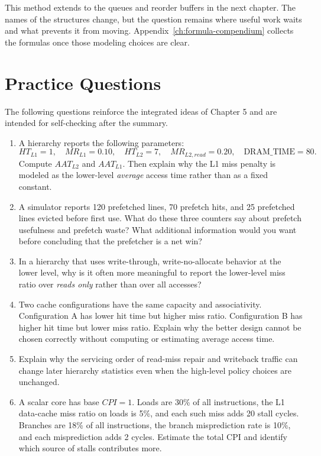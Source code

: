 This method extends to the queues and reorder buffers in the next chapter.
The names of the structures change, but the question remains where useful work waits and what prevents it from moving.
Appendix~\ref{ch:formula-compendium} collects the formulas once those modeling choices are clear.


\section{Practice Questions}\label{sec:ch5-practice}
The following questions reinforce the integrated ideas of Chapter 5 and are intended for self-checking after the summary.
\begin{enumerate}[beginpenalty=10000]
    \item A hierarchy reports the following parameters:
    \[
        HT_{L1}=1,\quad MR_{L1}=0.10,\quad HT_{L2}=7,\quad MR_{L2,read}=0.20,\quad \text{DRAM\_TIME}=80.
    \]
    Compute $AAT_{L2}$ and $AAT_{L1}$.
    Then explain why the L1 miss penalty is modeled as the lower-level \emph{average} access time rather than as a fixed constant.
    \item A simulator reports 120 prefetched lines, 70 prefetch hits, and 25 prefetched lines evicted before first use.
    What do these three counters say about prefetch usefulness and prefetch waste?
    What additional information would you want before concluding that the prefetcher is a net win?
    \item In a hierarchy that uses write-through, write-no-allocate behavior at the lower level, why is it often more meaningful to report the lower-level miss ratio over \emph{reads only} rather than over all accesses?
    \item Two cache configurations have the same capacity and associativity.
    Configuration A has lower hit time but higher miss ratio.
    Configuration B has higher hit time but lower miss ratio.
    Explain why the better design cannot be chosen correctly without computing or estimating average access time.
    \item Explain why the servicing order of read-miss repair and writeback traffic can change later hierarchy statistics even when the high-level policy choices are unchanged.
    \item A scalar core has base $CPI=1$.
    Loads are 30\% of all instructions, the L1 data-cache miss ratio on loads is 5\%, and each such miss adds 20 stall cycles.
    Branches are 18\% of all instructions, the branch misprediction rate is 10\%, and each misprediction adds 2 cycles.
    Estimate the total CPI and identify which source of stalls contributes more.
\end{enumerate}
